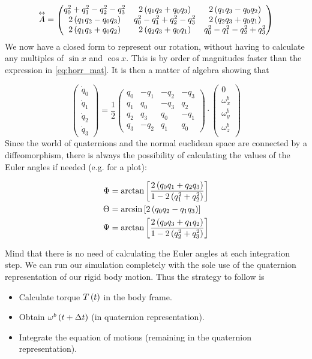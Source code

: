 $$
\overset{\leftrightarrow}{A}= 
\begin{pmatrix}
 q_0^2 + q_1^2 -q_2^2 -q_3^2  & 2\left(q_1q_2+q_0q_3\right)  & 2\left(q_1q_3-q_0q_2\right) \\
 2\left(q_1q_2-q_0q_3\right)  & q_0^2 -q_1^2 +q_2^2 -q_3^2 &  2\left(q_2q_3+q_0q_1\right) \\
  2\left(q_1q_3+q_0q_2\right) &  2\left(q_2q_3+q_0q_1\right)  & q_0^2 -q_1^2 -q_2^2 +q_3^2
\end{pmatrix} 
$$
We now have a closed form to represent our rotation, without having to calculate any multiples of $\sin{x}$ and $\cos{x}$. This is by order of magnitudes faster than the expression in \eqref{eq:horr_mat}. It is then a matter of algebra showing that


$$
\begin{pmatrix}
 \dot{q}_0\\
 \dot{q}_1\\
  \dot{q}_2\\
   \dot{q}_3
   \end{pmatrix} 
= \frac{1}{2}
\begin{pmatrix}
 q_0 & - q_1 &  -q_2 & -q_3 \\
 q_1 &   q_0 &  -q_3 &  q_2 \\
 q_2 &   q_3 &   q_0 & -q_1 \\
 q_3 & - q_2 &   q_1 &  q_0 
\end{pmatrix} 
\cdot
\begin{pmatrix}
 0\\
\omega^b_x\\
\omega^b_y\\
\omega^b_z\\
   \end{pmatrix} 
$$
Since the world of quaternions and the normal euclidean space are connected by a diffeomorphism, there is always the possibility of calculating the values of the Euler angles if needed (e.g. for a plot):

\begin{align}
\Phi &= \text{arctan}\left[ \frac{2\left(q_0q_1+q_2q_3\right)}{ 1- 2\left(q_1^2+q_2^2\right)}  \right]  \\
\Theta &= \text{arcsin}\left[ 2\left(q_0q_2-q_1q_3\right) \right]  \\
\Psi &= \text{arctan}\left[ \frac{2\left(q_0q_3+q_1q_2\right)}{ 1- 2\left(q_2^2+q_3^2\right)}  \right]  
\label{eq:quaternions_back}
\end{align}

Mind that there is no need of calculating the Euler angles at each integration step. We can run our simulation completely with the sole use of the quaternion representation of our rigid body motion. Thus the strategy to follow is

\begin{itemize}
\item Calculate torque $T\left(t\right)$ in the body frame.
\item Obtain $\omega^b\left(t+\Delta t\right)$ (in quaternion representation).
\item Integrate the equation of motions (remaining in the quaternion representation).
\end{itemize}








